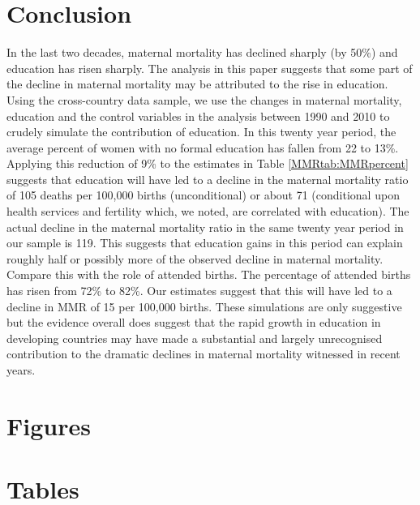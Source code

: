 \documentclass{article}[12pt,subeqn]
\newcommand{\MMRfolder}{"/home/damiancclarke/investigacion/Activa/MMR"}
\begin{document}
\begin{spacing}{1.4}
\section{Conclusion}
In the last two decades, maternal mortality has declined sharply (by 50\%) and 
education has risen sharply. The analysis in this paper suggests that some part 
of the decline in maternal mortality may be attributed to the rise in education. 
Using the cross-country data sample, we use the changes in maternal mortality, 
education and the control variables in the analysis between 1990 and 2010 to 
crudely simulate the contribution of education. In this twenty year period, the 
average percent of women with no formal education has fallen from 22 to 13\%. 
Applying this reduction of 9\% to the estimates in Table \ref{MMRtab:MMRpercent} 
suggests that education will have led to a decline in the maternal mortality 
ratio of 105 deaths per 100,000 births (unconditional) or about 71 (conditional 
upon health services and fertility which, we noted, are correlated with 
education). The actual decline in the maternal mortality ratio in the same twenty 
year period in our sample is 119. This suggests that education gains in this 
period can explain roughly half or possibly more of the observed decline in 
maternal mortality. Compare this with the role of attended births. The percentage 
of attended births has risen from 72\% to 82\%. Our estimates suggest that this 
will have led to a decline in MMR of 15 per 100,000 births. These simulations are 
only suggestive but the evidence overall does suggest that the rapid growth in 
education in developing countries may have made a substantial and largely 
unrecognised contribution to the dramatic declines in maternal mortality witnessed 
in recent years.


\newpage
\section*{Figures}


\section*{Tables}
%





\newpage

\newpage


\appendix

\end{spacing}
\end{document}
